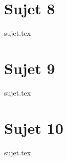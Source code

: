 \documentclass[a4paper, 11pt]{book}
\begin{document}
\chapter{Sujet 8}
\resetQ
{sujet.tex}

\chapter{Sujet 9}
\resetQ
{sujet.tex}

\chapter{Sujet 10}
\resetQ
{sujet.tex}
\end{document}

